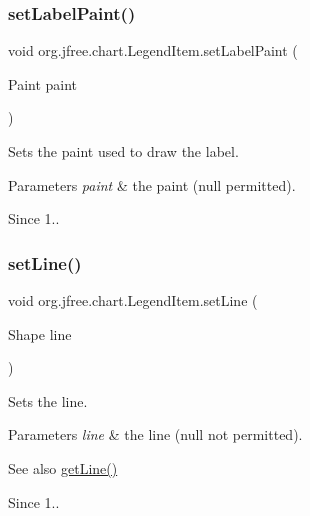 \subsubsection{\texorpdfstring{set\+Label\+Paint()}{setLabelPaint()}}
{\footnotesize\ttfamily void org.\+jfree.\+chart.\+Legend\+Item.\+set\+Label\+Paint (\begin{DoxyParamCaption}\item[{Paint}]{paint }\end{DoxyParamCaption})}

Sets the paint used to draw the label.


\begin{DoxyParams}{Parameters}
{\em paint} & the paint ({\ttfamily null} permitted).\\
\hline
\end{DoxyParams}
\begin{DoxySince}{Since}
1.. 
\end{DoxySince}
\mbox{\label{classorg_1_1jfree_1_1chart_1_1_legend_item_ac1f02a45ce3660d16dba77a970f28f44}} 
\subsubsection{\texorpdfstring{set\+Line()}{setLine()}}
{\footnotesize\ttfamily void org.\+jfree.\+chart.\+Legend\+Item.\+set\+Line (\begin{DoxyParamCaption}\item[{Shape}]{line }\end{DoxyParamCaption})}

Sets the line.


\begin{DoxyParams}{Parameters}
{\em line} & the line ({\ttfamily null} not permitted).\\
\hline
\end{DoxyParams}
\begin{DoxySeeAlso}{See also}
\mbox{\hyperlink{classorg_1_1jfree_1_1chart_1_1_legend_item_a26acef94552140dba2705f7a859d797c}{get\+Line()}} 
\end{DoxySeeAlso}
\begin{DoxySince}{Since}
1.. 
\end{DoxySince}
\mbox{\label{classorg_1_1jfree_1_1chart_1_1_legend_item_a6ab5955a7f911e86d4f1879d4254a57f}} 
